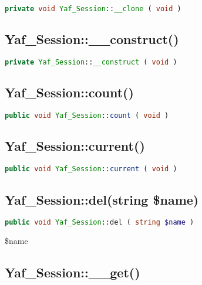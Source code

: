 \begin{lstlisting}[language=PHP]
private void Yaf_Session::__clone ( void )
\end{lstlisting}

\subsection{Yaf\_Session::\_\_construct()}



\begin{lstlisting}[language=PHP]
private Yaf_Session::__construct ( void )
\end{lstlisting}



\subsection{Yaf\_Session::count()}



\begin{lstlisting}[language=PHP]
public void Yaf_Session::count ( void )
\end{lstlisting}


\subsection{Yaf\_Session::current()}


\begin{lstlisting}[language=PHP]
public void Yaf_Session::current ( void )
\end{lstlisting}


\subsection{Yaf\_Session::del(string \$name)}


\begin{lstlisting}[language=PHP]
public void Yaf_Session::del ( string $name )
\end{lstlisting}



\begin{compactitem}
\item \$name
\end{compactitem}


\subsection{Yaf\_Session::\_\_get()}


